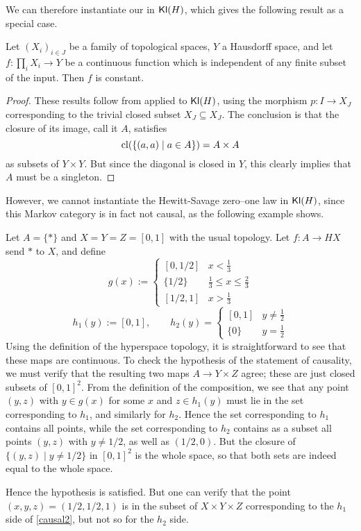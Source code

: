 \documentclass[11pt]{article}
\begin{document}
We can therefore instantiate our  in $\operatorname{\mathsf{Kl}}(H)$, which gives the following result as a special case.

\begin{corollary}
    Let $(X_i)_{i \in J}$ be a family of topological spaces, $Y$ a Hausdorff space, and let $f: \prod_i X_i \to Y$ be a continuous function
    which is independent of any finite subset of the input.
    Then $f$ is constant.
    \label{vietoris_kolmogorov}
\end{corollary}
\begin{proof}
	These results follow from  applied to $\operatorname{\mathsf{Kl}}(H)$,
    using the morphism $p : I \to X_J$ corresponding to the trivial closed subset $X_J \subseteq X_J$.
	The conclusion is that the closure of its image, call it $A$, satisfies
	\[
		\operatorname{cl}(\{(a,a) \mid a \in A\}) = A \times A
	\]
	as subsets of $Y \times Y$.
    But since the diagonal is closed in $Y$, this clearly implies that $A$ must be a singleton.
\end{proof}

However, we cannot instantiate the Hewitt-Savage zero--one law in $\operatorname{\mathsf{Kl}}(H)$, since this Markov category is in fact not causal, as the following example shows.

\begin{example}
	Let $A = \{*\}$ and $X = Y = Z = [0,1]$ with the usual topology.
    Let $f: A \to HX$ send $*$ to $X$, and define
    \[g(x) :=  \begin{cases} [0,1/2] & x < \frac{1}{3}\\ \{1/2\} & \frac{1}{3} \leq x \leq \frac{2}{3}\\ [1/2,1] & x > \frac{1}{3}\end{cases}\]
    \[
    	h_1(y) := [0,1], \qquad h_2(y) = \begin{cases}[0,1] & y \neq \frac{1}{2}\\ \{0\} &  y = \frac{1}{2}\end{cases}
    \]
    Using the definition of the hyperspace topology, it is straightforward to see that these maps are continuous. To check the hypothesis of the statement of causality, we must verify that the resulting two maps $A \to Y \times Z$ agree; these are just closed subsets of $[0,1]^2$. From the definition of the composition, we see that any point $(y,z)$ with $y \in g(x)$ for some $x$ and $z \in h_1(y)$ must lie in the set corresponding to $h_1$,
and similarly for $h_2$.
Hence the set corresponding to $h_1$ contains all points, while the set
corresponding to $h_2$ contains as a subset all points $(y,z)$ with $y\neq 1/2$,
as well as $(1/2,0)$.
But the closure of $\{(y,z) \mid y \neq 1/2\}$ in $[0,1]^2$ is the whole space, so that both sets are indeed equal to the whole space.

Hence the hypothesis is satisfied.
But one can verify that the point $(x,y,z) = (1/2,1/2,1)$ is in the subset of $X \times Y \times Z$ corresponding to the $h_1$ side of \eqref{causal2}, but not so for the $h_2$ side.
\end{example}
\end{document}
